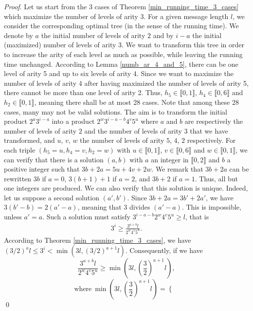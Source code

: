 \documentclass{llncs}
\renewenvironment{proof}{\paragraph{Proof} }{\hfill\qed}
\renewcommand{\paragraph}[1]{\noindent\textit{#1}.}
\begin{document}
\begin{proof}
Let us start from the 3 cases of Theorem \ref{min_running_time_3_cases} which maximize the number of levels of arity 3. 
For a given message length $l$, we consider the corresponding optimal tree (in the sense of the running time). 
We denote by $a$ the initial number of levels of arity $2$ and by $i-a$ the initial (maximized) number of levels of arity $3$. 
We want to transform this tree in order to increase the arity of each level as much as possible, while leaving the running time unchanged.
According to Lemma \ref{numb_ar_4_and_5}, there can be one level of arity 5 and up to six levels of arity 4.
Since we want to maximize the number of levels of arity 4 after having maximized the number of levels of arity 5, 
there cannot be more than one level of arity 2. Thus, $h_5 \in \llbracket 0, 1 \rrbracket$, $h_4 \in \llbracket 0, 6 \rrbracket$ 
and $h_2 \in \llbracket 0, 1 \rrbracket$, meaning there shall be at most 28 cases.
Note that among these 28 cases, many may not be valid solutions.
The aim is to transform the initial product $2^a3^{i-a}$ into
a product $2^w3^{i-a-b}4^v5^u$ where $a$ and $b$ are respectively the number of levels of arity $2$ and the number of levels of arity $3$ 
that we have transformed, and $u$, $v$, $w$ the number of levels of arity $5$,
$4$, $2$ respectively.
For each triple $(h_5=u,h_4=v,h_2=w)$ with $u \in \llbracket 0, 1 \rrbracket$, $v \in \llbracket 0, 6 \rrbracket$ 
and $w \in \llbracket 0, 1 \rrbracket$, we can verify that there is a solution $(a,b)$ with $a$ an integer in $\llbracket 0,2 \rrbracket$
and $b$ a positive integer such that $3b + 2a = 5u + 4v + 2w$. We remark that $3b + 2a$ can be rewritten $3b$ if $a=0$, $3(b+1)+1$ if $a=2$, and $3b+2$ if $a=1$. 
Thus, all but one integers are produced.
We can also verify that this solution is unique. Indeed, let us suppose a second solution $(a',b')$. Since $3b+2a=3b'+2a'$, we have
$3(b'-b)=2(a'-a)$, meaning that $3$ divides $(a'-a)$. This is impossible, unless $a'=a$. Such a solution must satisfy  $3^{i-a-b}2^w4^v5^u \geq l$, 
that is
\begin{eqnarray}\label{eqn_to_verify}
3^i \geq \frac{3^{a+b}l}{2^w4^v5^u}.
\end{eqnarray}
According to Theorem \ref{min_running_time_3_cases}, we have $(3/2)^al \leq 3^i < \min(3l,(3/2)^{a+1}l)$. Consequently, if we have 
\[\frac{3^{a+b}l}{2^w4^v5^u} \geq \min\left(3l,\left(\frac{3}{2}\right)^{a+1}l\right),\]
\[\textrm{where}\ \min\left(3l,\left(\frac{3}{2}\right)^{a+1}l\right)=\left\{
\begin{array}{ll}

\end{array}\]
\end{proof}
\end{document}
